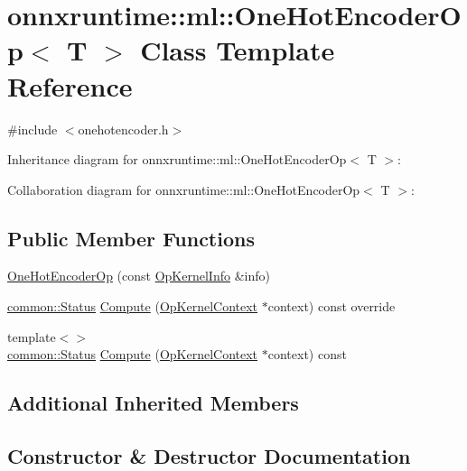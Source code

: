 \hypertarget{classonnxruntime_1_1ml_1_1OneHotEncoderOp}{}\section{onnxruntime\+:\+:ml\+:\+:One\+Hot\+Encoder\+Op$<$ T $>$ Class Template Reference}
\label{classonnxruntime_1_1ml_1_1OneHotEncoderOp}


{\ttfamily \#include $<$onehotencoder.\+h$>$}



Inheritance diagram for onnxruntime\+:\+:ml\+:\+:One\+Hot\+Encoder\+Op$<$ T $>$\+:


Collaboration diagram for onnxruntime\+:\+:ml\+:\+:One\+Hot\+Encoder\+Op$<$ T $>$\+:
\subsection*{Public Member Functions}
\begin{DoxyCompactItemize}
\item 
\mbox{\hyperlink{classonnxruntime_1_1ml_1_1OneHotEncoderOp_a81424c9c39e75b62c4629bfc847ed358}{One\+Hot\+Encoder\+Op}} (const \mbox{\hyperlink{classonnxruntime_1_1OpKernelInfo}{Op\+Kernel\+Info}} \&info)
\item 
\mbox{\hyperlink{classonnxruntime_1_1common_1_1Status}{common\+::\+Status}} \mbox{\hyperlink{classonnxruntime_1_1ml_1_1OneHotEncoderOp_a20e5ff93c4686bde8713baec7627697c}{Compute}} (\mbox{\hyperlink{classonnxruntime_1_1OpKernelContext}{Op\+Kernel\+Context}} $\ast$context) const override
\item 
{\footnotesize template$<$$>$ }\\\mbox{\hyperlink{classonnxruntime_1_1common_1_1Status}{common\+::\+Status}} \mbox{\hyperlink{classonnxruntime_1_1ml_1_1OneHotEncoderOp_afd312f77e1b049184f7e2c3dea4ff41d}{Compute}} (\mbox{\hyperlink{classonnxruntime_1_1OpKernelContext}{Op\+Kernel\+Context}} $\ast$context) const
\end{DoxyCompactItemize}
\subsection*{Additional Inherited Members}


\subsection{Constructor \& Destructor Documentation}
\mbox{\label{classonnxruntime_1_1ml_1_1OneHotEncoderOp_a81424c9c39e75b62c4629bfc847ed358}} 
